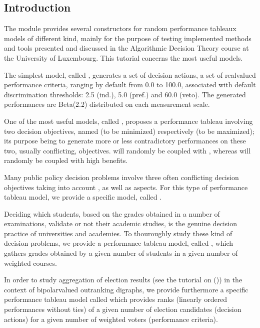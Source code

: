 \documentclass[a4paper,12pt,english]{sphinxhowto}
\begin{document}
\subsection{Introduction}
\label{\detokenize{tutorial:introduction}}
The  module provides several constructors for random performance tableaux models of different kind, mainly for the purpose of testing implemented methods and tools presented and discussed in the Algorithmic Decision Theory course at the University of Luxembourg. This tutorial concerns the most useful models.

The simplest model, called , generates
a set of  decision actions, a set of  real\sphinxhyphen{}valued
performance criteria, ranging by default from 0.0 to 100.0,
associated with default discrimination thresholds: 2.5 (ind.),
5.0 (pref.) and 60.0 (veto). The generated performances are
Beta(2.2) distributed on each measurement scale.

One of the most useful models, called
, proposes a performance tableau
involving two decision objectives,
named  (to be minimized) respectively  (to be
maximized); its purpose being to generate more or less
contradictory performances on these two, usually conflicting,
objectives.  will randomly be coupled with , whereas  will randomly be coupled
with high benefits.

Many public policy decision problems involve three often
conflicting decision objectives taking into account ,
 as well as  aspects. For this type of
performance tableau model, we provide a specific model,
called .

Deciding which students, based on the grades obtained in a
number of examinations, validate or not their academic studies,
is the genuine decision practice of universities and academies.
To thouroughly study these kind of decision problems,
we provide a performance tableau model, called
, which gathers grades
obtained by a given number of students in a given number of
weighted courses.

In order to study aggregation of election results (see the tutorial on
{\hyperref[\detokenize{tutorial:linearvoting-tutorial-label}]{}} ()) in the context
of bipolar\sphinxhyphen{}valued outranking digraphs, we provide furthermore a
specific performance tableau model called 
which provides ranks (linearly ordered performances without ties) of a given number of election candidates (decision actions) for a given number of weighted voters (performance criteria).
\end{document}
